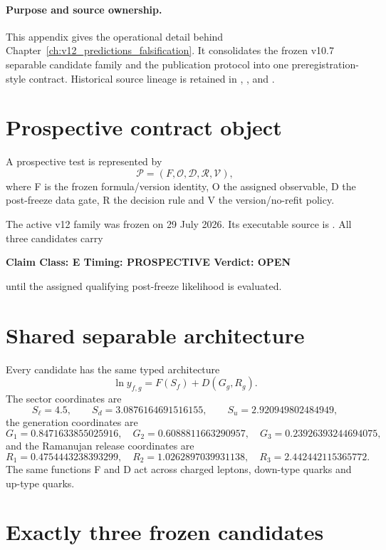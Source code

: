 \documentclass[11pt,a4paper,twoside]{book}
\def\({}%
\def\){}%
\theoremstyle{definition}
\newcommand{\vTwelveStatus}[3]{\par\noindent\textbf{Claim Class: #1 \quad Timing: #2 \quad Verdict: #3}\par}
\begin{document}
\paragraph{Purpose and source ownership.}
This appendix gives the operational detail behind
Chapter~\ref{ch:v12_predictions_falsification}.  It consolidates the frozen
v10.7 separable candidate family and the publication protocol into one
preregistration-style contract.  Historical source lineage is retained in
,
, and
.

\section{Prospective contract object}

A prospective test is represented by
\[
\boxed{
\mathcal P=(F,\mathcal O,\mathcal D,\mathcal R,\mathcal V),
}
\]
where \(F\) is the frozen formula/version identity, \(\mathcal O\) the assigned
observable, \(\mathcal D\) the post-freeze data gate, \(\mathcal R\) the decision
rule and \(\mathcal V\) the version/no-refit policy.

The active v12 family was frozen on 29 July 2026.  Its executable source is
.
All three candidates carry
\vTwelveStatus{E}{PROSPECTIVE}{OPEN}
until the assigned qualifying post-freeze likelihood is evaluated.

\section{Shared separable architecture}

Every candidate has the same typed architecture
\[
\boxed{
\ln y_{f,g}=F(S_f)+D(G_g,R_g).
}
\]
The sector coordinates are
\[
S_\ell=4.5,\qquad
S_d=3.0876164691516155,\qquad
S_u=2.920949802484949,
\]
the generation coordinates are
\[
G_1=0.8471633855025916,\quad
G_2=0.6088811663290957,\quad
G_3=0.23926393244694075,
\]
and the Ramanujan release coordinates are
\[
R_1=0.4754443238393299,\quad
R_2=1.0262897039931138,\quad
R_3=2.442442115365772.
\]
The same functions \(F\) and \(D\) act across charged leptons, down-type quarks
and up-type quarks.

\section{Exactly three frozen candidates}
\end{document}
